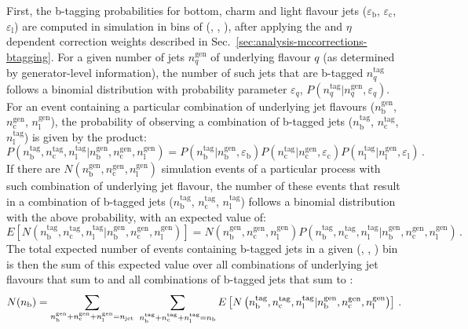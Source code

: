 First, the b-tagging probabilities for bottom, charm and light flavour jets 
($\varepsilon_\mathrm b$, $\varepsilon_\mathrm c$, $\varepsilon_\mathrm l$) are 
computed in simulation in bins of (\nj, \scalht, \mht), after applying the \pt 
and $\eta$ dependent correction weights described in 
Sec.~\ref{sec:analysis-mccorrections-btagging}.
For a given number of jets $n_q^\mathrm{gen}$ of underlying flavour $q$ (as 
determined by generator-level information), the number of such jets that are 
b-tagged $n_q^\mathrm{tag}$ follows a binomial distribution with probability 
parameter $\varepsilon_q$, $P(n_q^\mathrm{tag}|n_q^\mathrm{gen}, 
\varepsilon_q)$. For an event containing a particular combination of 
underlying jet flavours ($n_\mathrm b^\mathrm{gen}$, $n_\mathrm 
c^\mathrm{gen}$, $n_\mathrm l^\mathrm{gen}$), the probability of observing a 
combination of b-tagged jets ($n_\mathrm b^\mathrm{tag}$, $n_\mathrm 
c^\mathrm{tag}$, $n_\mathrm l^\mathrm{tag}$) is given by the product:
\begin{equation}
P\left( n_\mathrm b^\mathrm{tag}, n_\mathrm c^\mathrm{tag}, n_\mathrm 
l^\mathrm{tag} | n_\mathrm b^\mathrm{gen}, n_\mathrm c^\mathrm{gen}, n_\mathrm 
l^\mathrm{gen} \right) = P\left(n_\mathrm b^\mathrm{tag}|n_\mathrm 
b^\mathrm{gen}, \varepsilon_\mathrm b\right) P\left(n_\mathrm 
c^\mathrm{tag}|n_\mathrm c^\mathrm{gen}, \varepsilon_\mathrm c\right) 
P\left(n_\mathrm l^\mathrm{tag}|n_\mathrm l^\mathrm{gen}, \varepsilon_\mathrm 
l\right) \, .
\end{equation}
If there are $N\left(n_\mathrm b^\mathrm{gen}, n_\mathrm 
c^\mathrm{gen}, n_\mathrm l^\mathrm{gen}\right)$ simulation events of a 
particular process with such 
combination of underlying jet flavour, the number of these events that result 
in a combination of b-tagged jets ($n_\mathrm b^\mathrm{tag}$, $n_\mathrm 
c^\mathrm{tag}$, $n_\mathrm l^\mathrm{tag}$) follows a binomial distribution 
with the above probability, with an expected value of:
\begin{equation}
E\left[N\left(n_\mathrm 
b^\mathrm{tag}, n_\mathrm c^\mathrm{tag}, n_\mathrm l^\mathrm{tag} | n_\mathrm 
b^\mathrm{gen}, n_\mathrm c^\mathrm{gen}, n_\mathrm l^\mathrm{gen}\right) 
\right] = N\left(n_\mathrm 
b^\mathrm{gen}, n_\mathrm c^\mathrm{gen}, n_\mathrm l^\mathrm{gen}\right) 
P\left( n_\mathrm b^\mathrm{tag}, n_\mathrm c^\mathrm{tag}, n_\mathrm 
l^\mathrm{tag} | n_\mathrm b^\mathrm{gen}, n_\mathrm c^\mathrm{gen}, n_\mathrm 
l^\mathrm{gen} \right) \, .
\end{equation}
The total expected number of events containing \nb b-tagged jets in a given 
(\njet, \scalht, \mht) bin is then the 
sum of this expected value over all combinations of underlying jet flavours 
that sum to \njet and all combinations of b-tagged jets that sum to \nb:
\begin{equation}
N(n_{\text{b}}) = \sum_{n_\mathrm b^\mathrm{gen} + n_\mathrm c^\mathrm{gen} + n_\mathrm 
l^\mathrm{gen} = n_{\text{jet}}} ~ \sum_{n_\mathrm b^\mathrm{tag} + n_\mathrm 
c^\mathrm{tag} + n_\mathrm l^\mathrm{tag} = n_{\text{b}}} E\left[N\left(n_\mathrm 
b^\mathrm{tag}, n_\mathrm c^\mathrm{tag}, n_\mathrm l^\mathrm{tag} | n_\mathrm 
b^\mathrm{gen}, n_\mathrm c^\mathrm{gen}, n_\mathrm l^\mathrm{gen}\right) 
\right] \, .
\end{equation}

